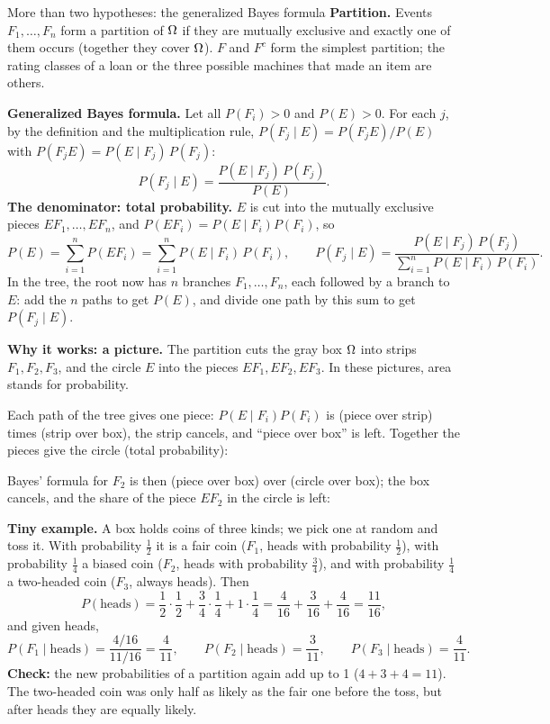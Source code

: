 \begin{key}{More than two hypotheses: the generalized Bayes formula}
	\setlength{\parskip}{5pt}
	\textbf{Partition.} Events $F_1,\dots,F_n$ form a partition of $\Omega$ if
	they are mutually exclusive and exactly one of them occurs (together
	they cover $\Omega$). $F$ and $F^c$ form the simplest partition; the rating
	classes of a loan or the three possible machines that made an item are
	others.

	\textbf{Generalized Bayes formula.} Let all $P(F_i)>0$ and $P(E)>0$. For
	each $j$, by the definition and
	the multiplication rule, $P(F_j\mid E)=P(F_jE)/P(E)$ with
	$P(F_jE)=P(E\mid F_j)\,P(F_j)$:
	\[ P(F_j\mid E)=\frac{P(E\mid F_j)\,P(F_j)}{P(E)}. \]
	\textbf{The denominator: total probability.} $E$ is cut into the mutually
	exclusive pieces $EF_1,\dots,EF_n$, and $P(EF_i)=P(E\mid F_i)P(F_i)$, so
	\[ P(E)=\sum_{i=1}^n P(EF_i)=\sum_{i=1}^n P(E\mid F_i)\,P(F_i),\qquad
		P(F_j\mid E)=\frac{P(E\mid F_j)\,P(F_j)}
		{\sum_{i=1}^n P(E\mid F_i)\,P(F_i)}. \]
	In the tree, the root now has $n$ branches $F_1,\dots,F_n$, each followed
	by a branch to $E$: add the $n$ paths to get $P(E)$, and divide one path
	by this sum to get $P(F_j\mid E)$.

	\noindent\begin{minipage}{\linewidth}
		\textbf{Why it works: a picture.} The partition cuts the gray box $\Omega$
		into strips $F_1,F_2,F_3$, and the circle $E$ into the pieces
		$EF_1,EF_2,EF_3$. In these pictures, area stands for probability.
		\begin{center}
			\gbayesvenn[.85]
		\end{center}
	\end{minipage}
	Each path of the tree gives one piece: $P(E\mid F_i)P(F_i)$ is (piece over
	strip) times (strip over box), the strip cancels, and ``piece over box''
	is left. Together the pieces give the circle (total probability):
	\begin{center}
		\gbayestotal[.9]
	\end{center}
	Bayes' formula for $F_2$ is then (piece over box) over (circle over box);
	the box cancels, and the share of the piece $EF_2$ in the circle is left:
	\begin{center}
		\gbayesproof[.9]
	\end{center}

	\textbf{Tiny example.} A box holds coins of three kinds; we pick one at
	random and toss it. With probability $\frac12$ it is a fair coin ($F_1$,
	heads with probability $\frac12$), with probability $\frac14$ a biased
	coin ($F_2$, heads with probability $\frac34$), and with probability
	$\frac14$ a two-headed coin ($F_3$, always heads). Then
	\[ P(\text{heads})=\frac12\cdot\frac12+\frac34\cdot\frac14
		+1\cdot\frac14=\frac{4}{16}+\frac{3}{16}+\frac{4}{16}
		=\frac{11}{16}, \]
	and given heads,
	\[ P(F_1\mid\text{heads})=\frac{4/16}{11/16}=\frac{4}{11},\qquad
		P(F_2\mid\text{heads})=\frac{3}{11},\qquad
		P(F_3\mid\text{heads})=\frac{4}{11}. \]
	\textbf{Check:} the new probabilities of a partition again add up to 1
	($4+3+4=11$). The two-headed coin was only half as likely as the fair one
	before the toss, but after heads they are equally likely.
\end{key}

